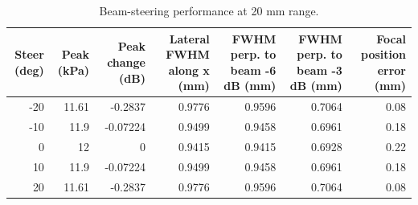 \begin{table}
\caption{Beam-steering performance at 20 mm range.}
\label{tab:T_S3_steering}
\begin{tabular}{rrrrrrr}
\toprule
Steer (deg) & Peak (kPa) & Peak change (dB) & Lateral FWHM along x (mm) & FWHM perp. to beam -6 dB (mm) & FWHM perp. to beam -3 dB (mm) & Focal position error (mm) \\
\midrule
-20 & 11.61 & -0.2837 & 0.9776 & 0.9596 & 0.7064 & 0.08 \\
-10 & 11.9 & -0.07224 & 0.9499 & 0.9458 & 0.6961 & 0.18 \\
0 & 12 & 0 & 0.9415 & 0.9415 & 0.6928 & 0.22 \\
10 & 11.9 & -0.07224 & 0.9499 & 0.9458 & 0.6961 & 0.18 \\
20 & 11.61 & -0.2837 & 0.9776 & 0.9596 & 0.7064 & 0.08 \\
\bottomrule
\end{tabular}
\end{table}
